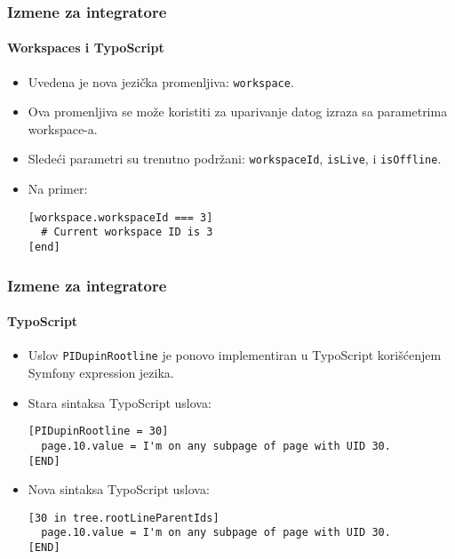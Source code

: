\begin{frame}[fragile]
	\frametitle{Izmene za integratore}
	\framesubtitle{Workspaces i TypoScript}

	\lstset{basicstyle=\smaller\ttfamily}

	\begin{itemize}
		\item Uvedena je nova jezička promenljiva: \texttt{workspace}.
		\item Ova promenljiva se može koristiti za uparivanje datog izraza sa
			parametrima workspace-a.
		\item Sledeći parametri su trenutno podržani:\newline
			\small
				\texttt{workspaceId}, \texttt{isLive}, i \texttt{isOffline}.
			\normalsize
		\item Na primer:

\vspace{-0.4cm}
\begin{lstlisting}
[workspace.workspaceId === 3]
  # Current workspace ID is 3
[end]
\end{lstlisting}

	\end{itemize}

\end{frame}


\begin{frame}[fragile]
	\frametitle{Izmene za integratore}
	\framesubtitle{TypoScript}

	\lstset{basicstyle=\smaller\ttfamily}

	\begin{itemize}
		\item Uslov \texttt{PIDupinRootline} je ponovo implementiran u TypoScript
			korišćenjem Symfony expression jezika.
		\item Stara sintaksa TypoScript uslova:

\vspace{-0.4cm}
\begin{lstlisting}
[PIDupinRootline = 30]
  page.10.value = I'm on any subpage of page with UID 30.
[END]
\end{lstlisting}

		\item Nova sintaksa TypoScript uslova:

\vspace{-0.4cm}
\begin{lstlisting}
[30 in tree.rootLineParentIds]
  page.10.value = I'm on any subpage of page with UID 30.
[END]
\end{lstlisting}

	\end{itemize}

\end{frame}

